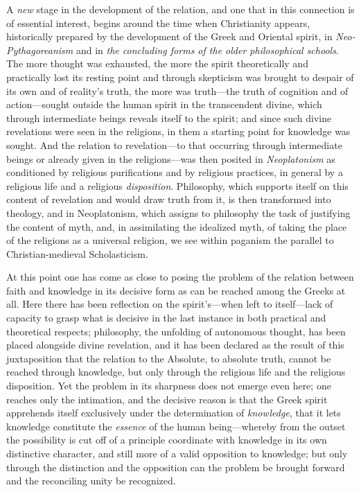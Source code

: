\documentclass[12pt,a4paper]{book}
\begin{document}
A \emph{new} stage in the development of the relation, and one that in this
connection is of essential interest, begins around the time when
Christianity appears, historically prepared by the development of the
Greek and Oriental spirit, in \emph{Neo-Pythagoreanism} and in \emph{the concluding
forms of the older philosophical schools}. The more thought was
exhausted, the more the spirit theoretically and practically lost its
resting point and through skepticism was brought to despair of its own
and of reality's truth, the more was truth---the truth of cognition and
of action---sought outside the human spirit in the transcendent divine,
which through intermediate beings reveals itself to the spirit; and
since such divine revelations were seen in the religions, in them a
starting point for knowledge was sought. And the relation to
revelation---to that occurring through intermediate beings or already
given in the religions---was then posited in \emph{Neoplatonism} as conditioned
by religious purifications and by religious practices, in general by a
religious life and a religious \emph{disposition}. Philosophy, which supports
itself on this content of revelation and would draw truth from it, is
then transformed into theology, and in Neoplatonism, which assigns to
philosophy the task of justifying the content of myth, and, in
assimilating the idealized myth, of taking the place of the religions as
a universal religion, we see within paganism the parallel to
Christian-medieval Scholasticism.

At this point one has come as close to posing the problem of the
relation between faith and knowledge in its decisive form as can be
reached among the Greeks at all. Here there has been reflection on the
spirit's---when left to itself---lack of capacity to grasp what is
decisive in the last instance in both practical and theoretical
respects; philosophy, the unfolding of autonomous thought, has been
placed alongside divine revelation, and it has been declared as the
result of this juxtaposition that the relation to the Absolute, to
absolute truth, cannot be reached through knowledge, but only through
the religious life and the religious disposition. Yet the problem in its
sharpness does not emerge even here; one reaches only the intimation,
and the decisive reason is that the Greek spirit apprehends itself
exclusively under the determination of \emph{knowledge}, that it lets knowledge
constitute the \emph{essence} of the human being---whereby from the outset the
possibility is cut off of a principle coordinate with knowledge in its
own distinctive character, and still more of a valid opposition to
knowledge; but only through the distinction and the opposition can the
problem be brought forward and the reconciling unity be recognized.
\end{document}

